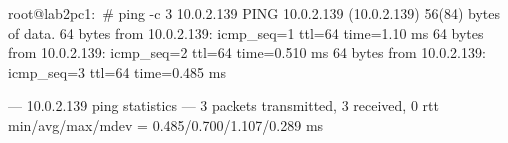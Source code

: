 root@lab2pc1:~# ping -c 3 10.0.2.139
PING 10.0.2.139 (10.0.2.139) 56(84) bytes of data.
64 bytes from 10.0.2.139: icmp_seq=1 ttl=64 time=1.10 ms
64 bytes from 10.0.2.139: icmp_seq=2 ttl=64 time=0.510 ms
64 bytes from 10.0.2.139: icmp_seq=3 ttl=64 time=0.485 ms

--- 10.0.2.139 ping statistics ---
3 packets transmitted, 3 received, 0%
rtt min/avg/max/mdev = 0.485/0.700/1.107/0.289 ms

